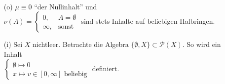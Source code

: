 \begin{example} \
\begin{enumerate}
	\item[(o)] $\mu \equiv 0$ ``der Nullinhalt'' und\\
				$\nu(A) = \begin{cases}
					0,       & A = \emptyset \\
					\infty, & \text{sonst}
				\end{cases}$
				sind stets Inhalte auf beliebigen Halbringen.
	\item[(i)] Sei $X$ nichtleer. Betrachte die Algebra $\{ \emptyset, X\} \subset \mathcal{P}(X)$. So wird ein Inhalt \\
			$\begin{cases}
				\emptyset \mapsto 0 \\
				x \mapsto v \in [0,\infty] \text{ beliebig}
			\end{cases}$
			definiert.
\end{enumerate}
\end{example}

